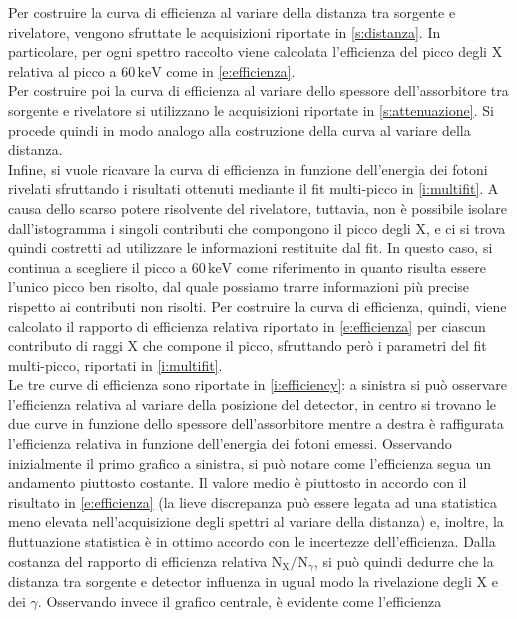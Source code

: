 \documentclass[twocolumn,10pt]{asme2ej}
\begin{document}
Per costruire la curva di efficienza al variare della distanza tra sorgente e rivelatore, vengono sfruttate le
acquisizioni riportate in \autoref{s:distanza}. In particolare, per ogni spettro raccolto viene calcolata l'efficienza
del picco degli X relativa al picco a $60\,\si{\kilo\electronvolt}$ come in \autoref{e:efficienza}. \\
Per costruire poi la curva di efficienza al variare dello spessore dell'assorbitore tra sorgente e rivelatore si
utilizzano le acquisizioni riportate in \autoref{s:attenuazione}. Si procede quindi in modo analogo alla costruzione
della curva al variare della distanza. \\
Infine, si vuole ricavare la curva di efficienza in funzione dell'energia dei fotoni rivelati sfruttando  i risultati
ottenuti mediante il fit multi-picco in \autoref{i:multifit}. A causa dello scarso potere risolvente del rivelatore,
tuttavia, non è possibile isolare dall'istogramma i singoli contributi che compongono il picco degli X, e ci si trova
quindi costretti ad utilizzare le informazioni restituite dal fit. In questo caso, si continua a scegliere il picco a
$60\,\si{\kilo\electronvolt}$ come riferimento in quanto risulta essere l'unico picco ben risolto, dal quale possiamo
trarre informazioni più precise rispetto ai contributi non risolti. Per costruire la curva di efficienza, quindi, viene
calcolato il rapporto di efficienza relativa riportato in \autoref{e:efficienza} per ciascun contributo di raggi X che
compone il picco, sfruttando però i parametri del fit multi-picco, riportati in \autoref{i:multifit}. \\
Le tre curve di efficienza sono riportate in \autoref{i:efficiency}: a sinistra si può osservare l'efficienza relativa
al variare della posizione del detector, in centro si trovano le due curve in funzione dello spessore dell'assorbitore
mentre a destra è raffigurata l'efficienza relativa in funzione dell'energia dei fotoni emessi. Osservando inizialmente
il primo grafico a sinistra, si può notare come l'efficienza segua un andamento piuttosto costante. Il valore medio è
piuttosto in accordo con il risultato in \autoref{e:efficienza} (la lieve discrepanza può essere legata ad una
statistica meno elevata nell'acquisizione degli spettri al variare della distanza) e, inoltre, la fluttuazione
statistica è in ottimo accordo con le incertezze dell'efficienza. Dalla costanza del rapporto di efficienza relativa
$\text{N}_{\text{X}}/\text{N}_{\gamma}$, si può quindi dedurre che la distanza tra sorgente e detector influenza in
ugual modo la rivelazione degli X e dei $\gamma$. Osservando invece il grafico centrale, è evidente come l'efficienza
\end{document}
